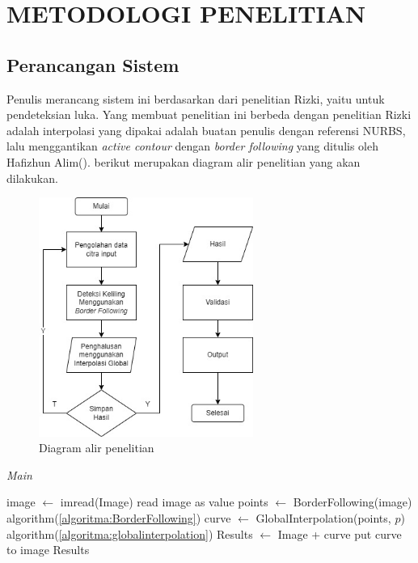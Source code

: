 \chapter{METODOLOGI PENELITIAN}

\section{Perancangan Sistem}

Penulis merancang sistem ini berdasarkan dari 
penelitian Rizki, yaitu untuk pendeteksian luka. 
Yang membuat penelitian ini berbeda dengan penelitian 
Rizki adalah interpolasi yang dipakai adalah buatan 
penulis dengan referensi NURBS, lalu menggantikan 
\textit{active contour} dengan \textit{border following} 
yang ditulis oleh Hafizhun Alim(\cite{Hafizhun}). berikut merupakan diagram 
alir penelitian yang akan dilakukan.

\begin{figure}[H]
	\centering
	\includegraphics[keepaspectratio,width = 7cm]{gambar/Bab3Extra/Diagram_alur.jpg}
	\caption{Diagram alir penelitian}
	\label{diagramalur}
\end{figure}

\begin{algorithm}[H]
  \caption{\textit{Main}}
  \begin{algorithmic}[1]
    \State image $\gets$ imread(Image) \Comment read image as value
    \State points $\gets$ BorderFollowing(image) \Comment algorithm(\ref{algoritma:BorderFollowing})
    \State curve $\gets$ GlobalInterpolation(points, $p$) \Comment algorithm(\ref{algoritma:globalinterpolation})
    \State Results $\gets$ Image + curve \Comment put curve to image
    \State \Return Results
  \EndFunction
  \end{algorithmic}
  \label{algoritma:main}
\end{algorithm}

